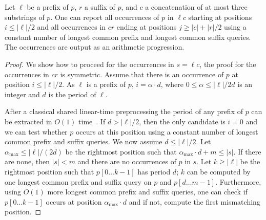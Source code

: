 \begin{proposition}\label{claim:big_overlap}
Let $\ell$ be a prefix of $p$, $r$ a suffix of $p$, and $c$ a concatenation of at most three substrings of $p$. One can report all occurrences of $p$ in $\ell c$ starting at positions $i \leq |\ell|/2$ and all occurrences in $cr$ ending at positions $j \geq |c|+|r|/2$ using a constant number of longest common prefix and longest common suffix queries.
%
The occurrences are output as an arithmetic progression.
\end{proposition}
\begin{proof}
We show how to proceed for the occurrences in $s = \ell c$, the proof for the occurrences in $c r$ is symmetric. Assume that there is an occurrence of $p$ at position $i \leq |\ell|/2$. As $\ell$ is a prefix of $p$, $i= \alpha \cdot d$, where $0 \leq \alpha \leq |\ell|/2d$ is an integer and $d$ is the period of $\ell$. 

After a classical shared linear-time preprocessing the period of any prefix of $p$ can be extracted in $O(1)$ time~\cite{KMP}. If $d >|\ell|/2$, then the only candidate is $i=0$ and we can test whether $p$ occurs at this position using a constant number of longest common prefix and suffix queries.
We now assume $d \leq |\ell|/2$. Let $\alpha_{\max} \leq |\ell|/(2d)$ be the rightmost position such that $\alpha_{\max} \cdot d +m \leq |s|$. If there are none, then $|s| < m$ and there are no occurrences of $p$ in $s$. Let $k \geq |\ell|$ be the rightmost position such that $p[0 \dots k-1]$ has period $d$; $k$ can be computed by one longest common prefix and suffix query on $p$ and $p[d \dots m-1]$. Furthermore, using $O(1)$ more longest common prefix and suffix queries, one can check if $p[0 \dots k-1]$ occurs at position $\alpha_{\max} \cdot d$ and if not, compute the first mismatching position.


\end{proof}
